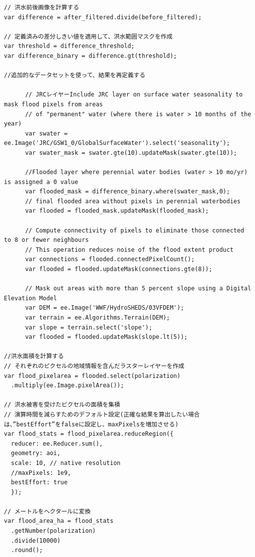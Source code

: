 \documentclass[
]{book}
\begin{document}
\begin{verbatim}
// 洪水前後画像を計算する
var difference = after_filtered.divide(before_filtered);

// 定義済みの差分しきい値を適用して、洪水範囲マスクを作成 
var threshold = difference_threshold;
var difference_binary = difference.gt(threshold);

//追加的なデータセットを使って、結果を再定義する
      
      // JRCレイヤーInclude JRC layer on surface water seasonality to mask flood pixels from areas
      // of "permanent" water (where there is water > 10 months of the year)
      var swater = ee.Image('JRC/GSW1_0/GlobalSurfaceWater').select('seasonality');
      var swater_mask = swater.gte(10).updateMask(swater.gte(10));
      
      //Flooded layer where perennial water bodies (water > 10 mo/yr) is assigned a 0 value
      var flooded_mask = difference_binary.where(swater_mask,0);
      // final flooded area without pixels in perennial waterbodies
      var flooded = flooded_mask.updateMask(flooded_mask);
      
      // Compute connectivity of pixels to eliminate those connected to 8 or fewer neighbours
      // This operation reduces noise of the flood extent product 
      var connections = flooded.connectedPixelCount();    
      var flooded = flooded.updateMask(connections.gte(8));
      
      // Mask out areas with more than 5 percent slope using a Digital Elevation Model 
      var DEM = ee.Image('WWF/HydroSHEDS/03VFDEM');
      var terrain = ee.Algorithms.Terrain(DEM);
      var slope = terrain.select('slope');
      var flooded = flooded.updateMask(slope.lt(5));

//洪水面積を計算する
// それぞれのピクセルの地域情報を含んだラスターレイヤーを作成 
var flood_pixelarea = flooded.select(polarization)
  .multiply(ee.Image.pixelArea());

// 洪水被害を受けたピクセルの面積を集積
// 演算時間を減らすためのデフォルト設定(正確な結果を算出したい場合は、”bestEffort”をfalseに設定し、maxPixelsを増加させる)
var flood_stats = flood_pixelarea.reduceRegion({
  reducer: ee.Reducer.sum(),              
  geometry: aoi,
  scale: 10, // native resolution 
  //maxPixels: 1e9,
  bestEffort: true
  });

// メートルをヘクタールに変換  
var flood_area_ha = flood_stats
  .getNumber(polarization)
  .divide(10000)
  .round(); 
\end{verbatim}
\end{document}
